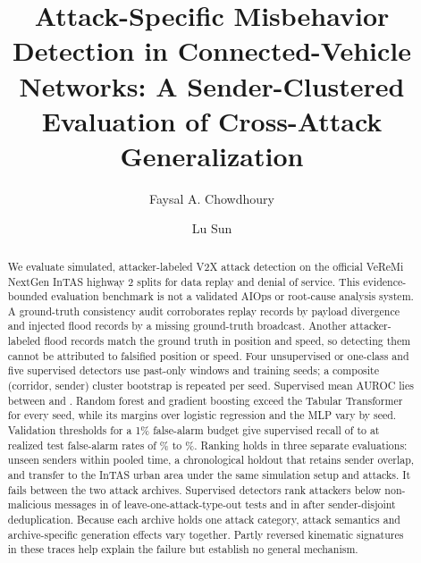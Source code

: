\documentclass[preprint,12pt,numafflabel]{elsarticle}
\begin{document}
\begin{frontmatter}

\title{Attack-Specific Misbehavior Detection in Connected-Vehicle Networks: A Sender-Clustered Evaluation of Cross-Attack Generalization}

\author[1]{Faysal A. Chowdhoury}
\author[2]{Lu Sun}


\begin{abstract}
We evaluate simulated, attacker-labeled V2X attack detection on the official VeReMi NextGen InTAS highway 2 splits for data replay and denial of service. This evidence-bounded evaluation benchmark is not a validated AIOps or root-cause analysis system. A ground-truth consistency audit corroborates \ResAuditReplayDiffers{} replay records by payload divergence and \ResAuditDoSNoGT{} injected flood records by a missing ground-truth broadcast. Another \ResAuditDoSMatches{} attacker-labeled flood records match the ground truth in position and speed, so detecting them cannot be attributed to falsified position or speed. Four unsupervised or one-class and five supervised detectors use past-only windows and \ResSeeds{} training seeds; a composite (corridor, sender) cluster bootstrap is repeated per seed. Supervised mean AUROC lies between \ResSupAUROCMin{} and \ResSupAUROCMax. Random forest and gradient boosting exceed the Tabular Transformer for every seed, while its margins over logistic regression and the MLP vary by seed. Validation thresholds for a 1\% false-alarm budget give supervised recall of \ResSupCalRecallMin{} to \ResSupCalRecallMax{} at realized test false-alarm rates of \ResSupCalFARMin\% to \ResSupCalFARMax\%. Ranking holds in three separate evaluations: unseen senders within pooled time, a chronological holdout that retains sender overlap, and transfer to the InTAS urban area under the same simulation setup and attacks. It fails between the two attack archives. Supervised detectors rank attackers below non-malicious messages in \ResStdBelowHalf{} of \ResDedupSupPairs{} leave-one-attack-type-out tests and in \ResDedupBelowHalf{} after sender-disjoint deduplication. Because each archive holds one attack category, attack semantics and archive-specific generation effects vary together. Partly reversed kinematic signatures in these traces help explain the failure but establish no general mechanism.
\end{abstract}


\end{frontmatter}
\end{document}
